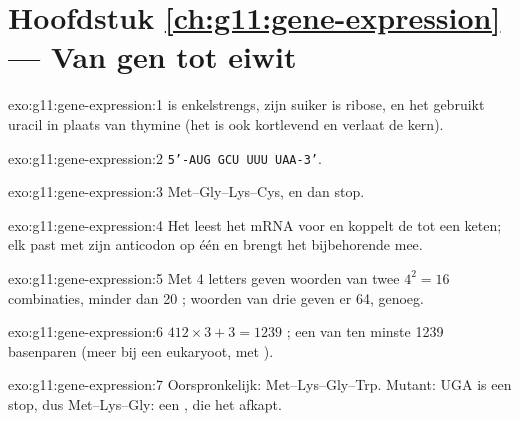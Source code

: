 \section*{Hoofdstuk \ref{ch:g11:gene-expression} --- Van gen tot eiwit}

\begin{solution}{exo:g11:gene-expression:1}
 is enkelstrengs, zijn suiker is ribose, en het gebruikt uracil in
plaats van thymine (het is ook kortlevend en verlaat de kern).
\end{solution}

\begin{solution}{exo:g11:gene-expression:2}
\texttt{5'-AUG GCU UUU UAA-3'}.
\end{solution}

\begin{solution}{exo:g11:gene-expression:3}
Met--Gly--Lys--Cys, en dan stop.
\end{solution}

\begin{solution}{exo:g11:gene-expression:4}
Het  leest het mRNA  voor  en koppelt de  tot
een keten; elk  past met zijn anticodon op één  en
brengt het bijbehorende  mee.
\end{solution}

\begin{solution}{exo:g11:gene-expression:5}
Met 4 letters geven woorden van twee $4^2 = 16$ combinaties, minder dan
20 ; woorden van drie geven er 64, genoeg.
\end{solution}

\begin{solution}{exo:g11:gene-expression:6}
$412 \times 3 + 3 = 1239$ ; een  van ten minste 1239
basenparen (meer bij een eukaryoot, met ).
\end{solution}

\begin{solution}{exo:g11:gene-expression:7}
Oorspronkelijk: Met--Lys--Gly--Trp. Mutant: UGA is een stop, dus
Met--Lys--Gly: een , die het  afkapt.
\end{solution}

